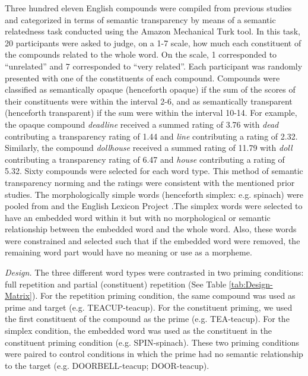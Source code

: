 \documentclass{frontiersSCNS}
\begin{document}
	Three hundred eleven English compounds were compiled from previous studies \citep*{Drieghe:2010, Fiorentino:2007, Fiorentino:2009, Juhasz:2003} and categorized in terms of semantic transparency by means of a semantic relatedness task conducted using the Amazon Mechanical Turk tool. In this task, 20 participants were asked to judge, on a 1-7 scale, how much each constituent of the compounds related to the whole word.  On the scale, 1 corresponded to “unrelated” and 7 corresponded to “very related”.  Each participant was randomly presented with one of the constituents of each compound.  Compounds were classified as semantically opaque (henceforth opaque) if the sum of the scores of their constituents were within the interval 2-6, and as semantically transparent (henceforth transparent) if the sum were within the interval 10-14. For example, the opaque compound \textit{deadline} received a summed rating of 3.76 with \textit{dead} contributing a transparency rating of 1.44 and \textit{line} contributing a rating of 2.32. Similarly, the compound \textit{dollhouse} received a summed rating of 11.79 with \textit{doll} contributing a transparency rating of 6.47 and \textit{house} contributing a rating of 5.32. Sixty compounds were selected for each word type. This method of semantic transparency norming and the ratings were consistent with the mentioned prior studies. 
	The morphologically simple words (henceforth simplex: e.g. spinach) were pooled from \citet{Rastle:2004} and the English Lexicon Project \citep*{Balota:2007}.The simplex words were selected to have an embedded word within it but with no morphological or semantic relationship between the embedded word and the whole word. Also, these words were constrained and selected such that if the embedded word were removed, the remaining word part would have no meaning or use as a morpheme.
 
\textit{Design.}  The three different word types were contrasted in two priming conditions: full repetition and partial (constituent) repetition (See Table \ref{tab:Design-Matrix}).  For the repetition priming condition, the same compound was used as prime and target (e.g. TEACUP-teacup). For the constituent priming, we used the first constituent of the compound as the prime (e.g. TEA-teacup). For the simplex condition, the embedded word was used as the constituent in the constituent priming condition (e.g. SPIN-spinach). These two priming conditions were paired to control conditions in which the prime had no semantic relationship to the target (e.g. DOORBELL-teacup; DOOR-teacup). 
\end{document}
